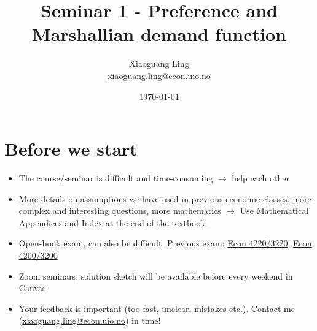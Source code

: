 \documentclass{article}
\title{Seminar 1 - Preference and Marshallian demand function}
\author{Xiaoguang Ling \\  \href{xiaoguang.ling@econ.uio.no}{xiaoguang.ling@econ.uio.no}}
\date{\today}
\begin{document}
\maketitle

\section*{Before we start}

\begin{itemize}
\item The course/seminar is difficult and time-consuming $\rightarrow$ help each other
\item More details on assumptions we have used in previous economic classes, more complex and interesting questions, more mathematics $\rightarrow$ Use Mathematical Appendices and Index at the end of the textbook. 
\item Open-book exam, can also be difficult. Previous exam: \href{https://www.uio.no/studier/emner/sv/oekonomi/ECON4220/previous-exams/}{Econ 4220/3220}, \href{https://www.uio.no/studier/emner/sv/oekonomi/ECON3200/previous-exams/index.html}{Econ 4200/3200}
\item Zoom seminars, solution sketch will be available before every weekend in Canvas.
\item Your feedback is important (too fast, unclear, mistakes etc.). Contact me (\href{xiaoguang.ling@econ.uio.no}{xiaoguang.ling@econ.uio.no}) in time!
\end{itemize}


\usetikzlibrary{arrows,shapes,positioning,shadows,trees}

\end{document}
